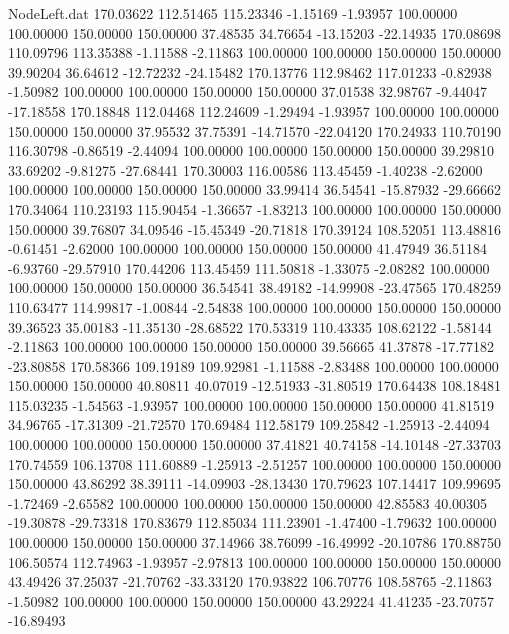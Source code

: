 \begin{filecontents}{NodeLeft.dat}
 170.03622  112.51465  115.23346    -1.15169   -1.93957  100.00000  100.00000  150.00000  150.00000   37.48535   34.76654  -13.15203  -22.14935
 170.08698  110.09796  113.35388    -1.11588   -2.11863  100.00000  100.00000  150.00000  150.00000   39.90204   36.64612  -12.72232  -24.15482
 170.13776  112.98462  117.01233    -0.82938   -1.50982  100.00000  100.00000  150.00000  150.00000   37.01538   32.98767   -9.44047  -17.18558
 170.18848  112.04468  112.24609    -1.29494   -1.93957  100.00000  100.00000  150.00000  150.00000   37.95532   37.75391  -14.71570  -22.04120
 170.24933  110.70190  116.30798    -0.86519   -2.44094  100.00000  100.00000  150.00000  150.00000   39.29810   33.69202   -9.81275  -27.68441
 170.30003  116.00586  113.45459    -1.40238   -2.62000  100.00000  100.00000  150.00000  150.00000   33.99414   36.54541  -15.87932  -29.66662
 170.34064  110.23193  115.90454    -1.36657   -1.83213  100.00000  100.00000  150.00000  150.00000   39.76807   34.09546  -15.45349  -20.71818
 170.39124  108.52051  113.48816    -0.61451   -2.62000  100.00000  100.00000  150.00000  150.00000   41.47949   36.51184   -6.93760  -29.57910
 170.44206  113.45459  111.50818    -1.33075   -2.08282  100.00000  100.00000  150.00000  150.00000   36.54541   38.49182  -14.99908  -23.47565
 170.48259  110.63477  114.99817    -1.00844   -2.54838  100.00000  100.00000  150.00000  150.00000   39.36523   35.00183  -11.35130  -28.68522
 170.53319  110.43335  108.62122    -1.58144   -2.11863  100.00000  100.00000  150.00000  150.00000   39.56665   41.37878  -17.77182  -23.80858
 170.58366  109.19189  109.92981    -1.11588   -2.83488  100.00000  100.00000  150.00000  150.00000   40.80811   40.07019  -12.51933  -31.80519
 170.64438  108.18481  115.03235    -1.54563   -1.93957  100.00000  100.00000  150.00000  150.00000   41.81519   34.96765  -17.31309  -21.72570
 170.69484  112.58179  109.25842    -1.25913   -2.44094  100.00000  100.00000  150.00000  150.00000   37.41821   40.74158  -14.10148  -27.33703
 170.74559  106.13708  111.60889    -1.25913   -2.51257  100.00000  100.00000  150.00000  150.00000   43.86292   38.39111  -14.09903  -28.13430
 170.79623  107.14417  109.99695    -1.72469   -2.65582  100.00000  100.00000  150.00000  150.00000   42.85583   40.00305  -19.30878  -29.73318
 170.83679  112.85034  111.23901    -1.47400   -1.79632  100.00000  100.00000  150.00000  150.00000   37.14966   38.76099  -16.49992  -20.10786
 170.88750  106.50574  112.74963    -1.93957   -2.97813  100.00000  100.00000  150.00000  150.00000   43.49426   37.25037  -21.70762  -33.33120
 170.93822  106.70776  108.58765    -2.11863   -1.50982  100.00000  100.00000  150.00000  150.00000   43.29224   41.41235  -23.70757  -16.89493

\end{filecontents}
